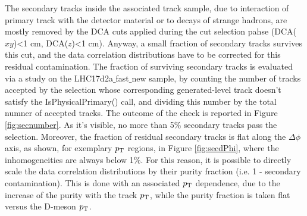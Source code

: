 \label{secondaries}
The secondary tracks inside the associated track sample, due to interaction of primary track with the detector material or to decays of strange hadrons, are mostly removed by the DCA cuts applied during the cut selection pahse (DCA($xy$)<1 cm, DCA($z$)<1 cm).
Anyway, a small fraction of secondary tracks survives this cut, and the data correlation distributions have to be corrected for this residual contamination.
The fraction of surviving secondary tracks is evaluated via a study on the LHC17d2a$\_$fast$\_$new sample, by counting the number of tracks accepted by the selection whose corresponding generated-level track doesn't satisfy the IsPhysicalPrimary() call, and dividing this number by the total numner of accepted tracks.
The outcome of the check is reported in Figure \ref{fig:secnumber}. As it's visible, no more than 5\% secondary tracks pass the selection. Moreover, the fraction of residual secondary tracks is flat along the $\Delta\phi$ axis, as shown, for exemplary $p_{\rm T}$ regions, in Figure \ref{fig:secdPhi}, where the inhomogeneities are always below 1\%.
For this reason, it is possible to directly scale the data correlation distributions by their purity fraction (i.e. 1 - secondary contamination). This is done with an associated $p_{\rm T}$ dependence, due to the increase of the purity with the track $p_{\rm T}$, while the purity fraction is taken flat versus the D-meson $p_{\rm T}$.

